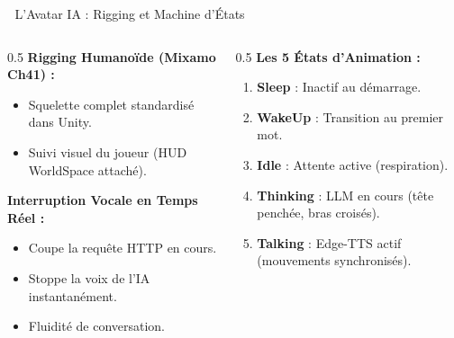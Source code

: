 \documentclass[aspectratio=169]{beamer}
\begin{document}
\begin{frame}{🧍 L'Avatar IA : Rigging et Machine d'États}
  \begin{columns}
    \begin{column}{0.5\textwidth}
      \textbf{Rigging Humanoïde (Mixamo Ch41) :}
      \begin{itemize}
        \item Squelette complet standardisé dans Unity.
        \item Suivi visuel du joueur (HUD WorldSpace attaché).
      \end{itemize}
      \vspace{0.2cm}
      \textbf{Interruption Vocale en Temps Réel :}
      \begin{itemize}
        \item Coupe la requête HTTP en cours.
        \item Stoppe la voix de l'IA instantanément.
        \item Fluidité de conversation.
      \end{itemize}
    \end{column}
    
    \begin{column}{0.5\textwidth}
      \textbf{Les 5 États d'Animation :}
      \begin{enumerate}
        \item \textbf{Sleep} : Inactif au démarrage.
        \item \textbf{WakeUp} : Transition au premier mot.
        \item \textbf{Idle} : Attente active (respiration).
        \item \textbf{Thinking} : LLM en cours (tête penchée, bras croisés).
        \item \textbf{Talking} : Edge-TTS actif (mouvements synchronisés).
      \end{enumerate}
    \end{column}
  \end{columns}

\end{frame}
\end{document}
